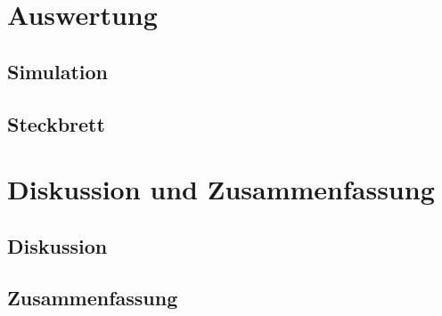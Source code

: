 \documentclass[12pt,english,ngerman]{scrartcl}
\begin{document}
\section{Auswertung}\label{sec:Auswertung}

\subsection{Simulation}

\subsection{Steckbrett}

\section{Diskussion und Zusammenfassung}\label{sec:Diskussion} 
\subsection{Diskussion}

\subsection{Zusammenfassung}

\newpage

\printbibliography

\listoffigures

\listoftables
\end{document}
